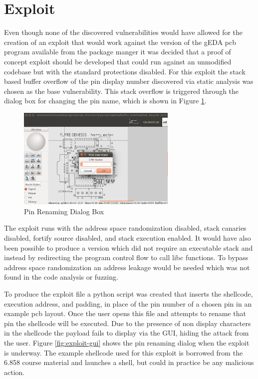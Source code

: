 \documentclass[12pt]{article}
\begin{document}
\section{Exploit}
\label{S:5}
Even though none of the discovered vulnerabilities would have allowed for the creation of an exploit that would work against the version of the gEDA pcb program available from the package manger it was decided that a proof of concept exploit should be developed that could run against an unmodified codebase but with the standard protections disabled. For this exploit the stack based buffer overflow of the pin display number discovered via static analysis was chosen as the base vulnerability. This stack overflow is triggered through the dialog box for changing the pin name, which is shown in Figure \ref{fig:rename-gui}. 
\begin{figure}[H]
\centering
\includegraphics[width=3in]{images/rename-gui.png}
\caption{Pin Renaming Dialog Box}
\label{fig:rename-gui}
\end{figure}

The exploit runs with the address space randomization disabled, stack canaries disabled, fortify source disabled, and stack execution enabled. It would have also been possible to produce a version which did not require an executable stack and instead by redirecting the program control flow to call libc functions. To bypass address space randomization an address leakage would be needed which was not found in the code analysis or fuzzing. 

To produce the exploit file a python script was created that inserts the shellcode, execution address, and padding, in place of the pin number of a chosen pin in an example pcb layout. Once the user opens this file and attempts to rename that pin the shellcode will be executed. Due to the presence of non display characters in the shellcode the payload fails to display via the GUI, hiding the attack from the user. Figure \ref{fig:exploit-gui} shows the pin renaming dialog when the exploit is underway. The example shellcode used for this exploit is borrowed from the 6.858 course material and launches a shell, but could in practice be any malicious action. 
\end{document}
